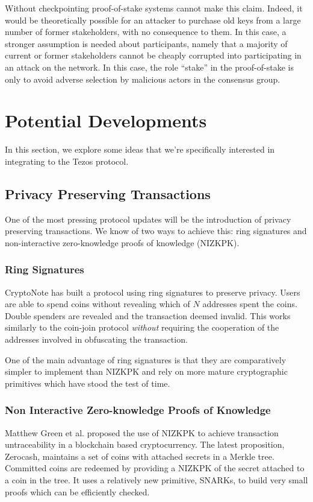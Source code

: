 \documentclass[letterpaper]{article}
\begin{document}
Without checkpointing proof-of-stake systems cannot make this claim. Indeed,
it would be theoretically possible for an attacker to purchase old keys from 
a large number of former stakeholders, with no consequence to them. In this case,
a stronger assumption is needed about participants, namely that a majority of current or
former stakeholders cannot be cheaply corrupted into participating in an
attack on the network. In this case, the role ``stake'' in the proof-of-stake is
only to avoid adverse selection by malicious actors in the consensus group.



\section{Potential Developments}

In this section, we explore some ideas
that we're specifically interested in integrating to the Tezos protocol.

\subsection{Privacy Preserving Transactions}
One of the most pressing protocol updates will be
the introduction of privacy preserving transactions.
We know of two ways to achieve this:
ring signatures and non-interactive zero-knowledge proofs of knowledge
(NIZKPK).

\subsubsection{Ring Signatures}
CryptoNote has built a protocol using ring signatures to preserve privacy.
Users are able to spend coins
without revealing which of $N$ addresses spent the coins.
Double spenders are revealed and the transaction deemed invalid.
This works similarly to the coin-join protocol
\emph{without} requiring the cooperation of the addresses involved in
obfuscating the transaction.

One of the main advantage of ring signatures is that they are comparatively
simpler to implement than NIZKPK and rely on more mature cryptographic
primitives which have stood the test of time.

\subsubsection{Non Interactive Zero-knowledge Proofs of Knowledge}
Matthew Green et al. proposed the use of NIZKPK
to achieve transaction untraceability in a blockchain based cryptocurrency.
The latest proposition, Zerocash, maintains
a set of coins with attached secrets in a Merkle tree.
Committed coins are redeemed by providing a NIZKPK
of the secret attached to a coin in the tree.
It uses a relatively new primitive, SNARKs,
to build very small proofs which can be efficiently checked.
\end{document}
